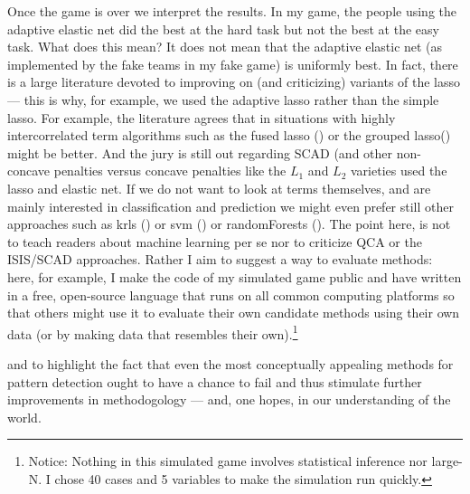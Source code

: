 \documentclass[12pt]{article}
\begin{document}
Once the game is over we interpret the results. In my game, the people using
the adaptive elastic net did the best at the hard task but not the best at the
easy task. What does this mean? It does not mean that the adaptive elastic net
(as implemented by the fake teams in my fake game) is uniformly best. In fact,
there is a large literature devoted to improving on (and criticizing) variants
of the lasso --- this is why, for example, we used the adaptive lasso rather
than the simple lasso. For example, the literature agrees that in situations
with highly intercorrelated term algorithms such as the fused lasso () or the
grouped lasso() might be better. And the jury is still out regarding SCAD (and
other non-concave penalties versus concave penalties like the $L_1$ and $L_2$
varieties used the lasso and elastic net. If we do not want to look at terms
themselves, and are mainly interested in classification and prediction we
might even prefer still other approaches such as krls () or svm () or
randomForests (). The point here, is not to teach readers about machine
learning per se nor to criticize QCA or the ISIS/SCAD approaches.  Rather I
aim to suggest a way to evaluate methods: here, for example, I make the code
of my simulated game public and have written in a free, open-source language
that runs on all common computing platforms so that others might use it to
evaluate their own candidate methods using their own data (or by making data
that resembles their own).\footnote{Notice: Nothing in this simulated game
	involves statistical inference nor large-N. I chose 40 cases and 5
	variables to make the simulation run quickly.}

and to highlight the
fact that even the most conceptually appealing methods for pattern detection
ought to have a chance to fail and thus stimulate further improvements in
methodogology --- and, one hopes, in our understanding of the world.
\end{document}
